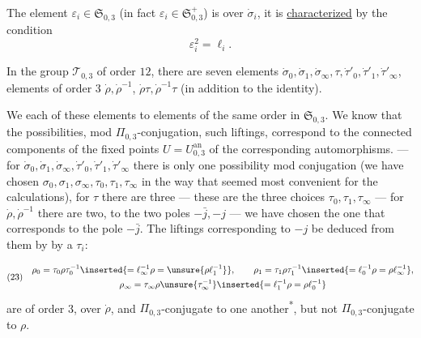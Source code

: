 The element $\varepsilon_i\in\mathfrak S_{0,3}$
(in fact $\varepsilon_i\in\mathfrak S_{0,3}^{+}$) is over $\dot\sigma_i$,
it is \uline{characterized} by the condition
\[
\varepsilon_i^2=\ell_i.
\]

In the group $\mathcal T_{0,3}$ of order $12$, there are seven  elements
$\dot\sigma_0,\dot\sigma_1,\dot\sigma_\infty,\tau,\dot\tau'_0,\dot\tau'_1,\dot\tau'_\infty$,
  elements of order $3$
$\dot\rho,\dot\rho^{-1}$, 
$\dot\rho\tau,\dot\rho^{-1}\tau$ (in addition to the identity).

We   each of these elements to elements of the same order in
$\mathfrak S_{0,3}$.
We know that the possibilities, mod $\Pi_{0,3}$-conjugation,  such liftings,
correspond to the connected components of the fixed points  $U=U_{0,3}^{\mathrm{an}}$
of the corresponding  automorphisms. --- for
$\dot\sigma_0,\dot\sigma_1,\dot\sigma_\infty,\dot\tau'_0,\dot\tau'_1,\dot\tau'_\infty$
there is only one possibility mod conjugation (we have chosen
$\sigma_0,\sigma_1,\sigma_\infty,\tau_0,\tau_1,\tau_\infty$
in the way that seemed most convenient for the calculations),
for $\tau$ there are three --- these are the three choices $\tau_0,\tau_1,\tau_\infty$
--- for $\dot\rho,\dot\rho^{-1}$ there are two,
 to the two poles $-\bar j,-j$ --- we have chosen the one that
corresponds to the pole $-\bar j$.
The liftings corresponding to $-j$  be deduced from them by  by a $\tau_i$:



\[
(23)\quad
\begin{gathered}
\rho_0=\tau_0\rho\tau_0^{-1}
\inserted{=\ell_\infty^{-1}\rho=\unsure{\rho \ell_1^{-1}}},\qquad
\rho_1=\tau_1\rho\tau_1^{-1}
\inserted{=\ell_0^{-1}\rho=\rho \ell_\infty^{-1}},\\
\rho_\infty=\tau_\infty\rho\unsure{\tau_\infty^{-1}}
\inserted{=\ell_1^{-1}\rho=\rho \ell_0^{-1}}
\end{gathered}
\]
are of order 3, over $\dot\rho$, and $\Pi_{0,3}$-conjugate to one another\textsuperscript{*}, but not $\Pi_{0,3}$-conjugate to $\rho$.

